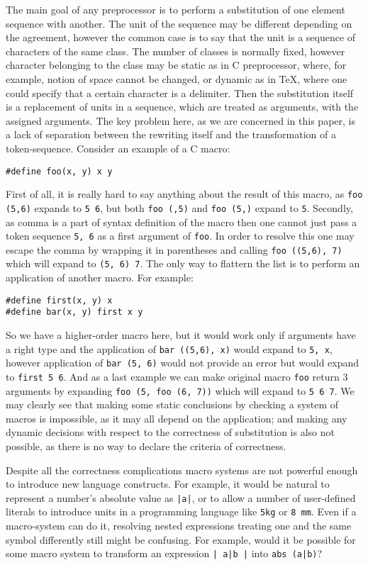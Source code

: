 The main goal of any preprocessor is to perform a substitution of
one element sequence with another.  The unit of the sequence may 
be different depending on the agreement, however the common
case is to say that the unit is a sequence of characters of the
same class.  The number of classes is normally fixed, however 
character belonging to the class may be static as in C preprocessor,
where, for example, notion of space cannot be changed, or dynamic as
in \TeX, where one could specify that a certain character is a 
delimiter.  Then the substitution itself is a replacement of 
units in a sequence, which are treated as arguments, with the 
assigned arguments.  The key problem here, as we are concerned
in this paper, is a lack of separation between the rewriting itself
and the transformation of a token-sequence.  Consider an example of
a C macro:
\begin{verbatim}
#define foo(x, y) x y
\end{verbatim}
First of all, it is really hard to say anything about the result
of this macro, as \verb|foo (5,6)| expands to \verb|5 6|, but
both \verb|foo (,5)| and \verb|foo (5,)| expand to \verb|5|.
Secondly, as comma is a part of syntax definition of the macro
then one cannot just pass a token sequence \verb|5, 6| as a
first argument of \verb|foo|.  In order to resolve this one
may escape the comma by wrapping it in parentheses and calling
\verb|foo ((5,6), 7)| which will expand to \verb|(5, 6) 7|.
The only way to flattern the list is to perform an application
of another macro.  For example:
\begin{verbatim}
#define first(x, y) x
#define bar(x, y) first x y
\end{verbatim}
So we have a higher-order macro here, but it would work only if
arguments have a right type and the application of 
\verb|bar ((5,6), x)| would expand to \verb|5, x|, however
application of \verb|bar (5, 6)| would not provide an error
but would expand to \verb|first 5 6|.  And as a last example
we can make original macro \verb|foo| return 3 arguments
by expanding \verb|foo (5, foo (6, 7))| which will expand to
\verb|5 6 7|.  We may clearly see that making some static 
conclusions by checking a system of macros is impossible, as
it may all depend on the application; and making any dynamic
decisions with respect to the correctness of substitution is
also not possible, as there is no way to declare the criteria
of correctness.

Despite all the correctness complications macro systems are not powerful
enough to introduce new language constructs.  For example, it would be natural
to represent a number's absolute value as \verb/|a|/, or to allow a number of
user-defined literals to introduce units in a programming language like 
\verb/5kg/ or \verb|8 mm|.  Even if a macro-system can do it, resolving nested
expressions treating one and the same symbol differently still might be
confusing.  For example, would it be possible for some macro system to
transform an expression \verb/| a|b |/ into \verb/abs (a|b)/?


